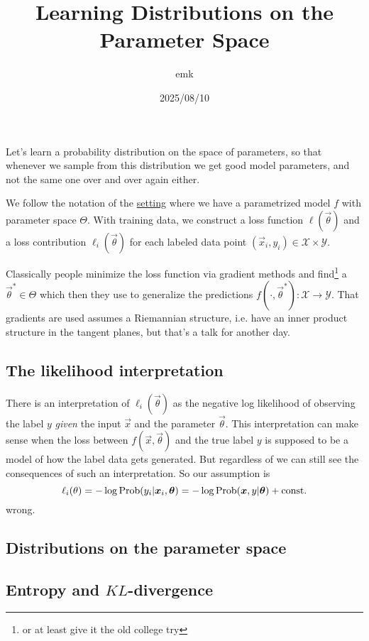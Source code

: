 \documentclass[12pt]{amsart}
\title{Learning Distributions on the Parameter Space}
\author{emk}
\date{2025/08/10}
\begin{document}
\maketitle

Let's learn a probability distribution on the space of parameters, so that whenever we sample from this distribution we get good model parameters, and not the same one over and over again either. 

We follow the notation of the \href{https://ekiral.github.io/blog/2025-06-05_notation.html}{setting} where we have a parametrized model $f$ with parameter space $\Theta$. With training data, we construct a loss function $\ell(\vec{\theta})$ and a loss contribution $\ell_i(\vec{\theta})$ for each labeled data point $(\vec{x}_i, y_i) \in \mathcal{X} \times \mathcal{Y}$. 

Classically people minimize the loss function via gradient methods and find\footnote{or at least give it the old college try} a $\vec{\theta}^* \in \Theta$ which then they use to generalize the predictions $f(\cdot, \vec{\theta}^*) : \mathcal{X} \to \mathcal{Y}$. That gradients are used assumes a Riemannian structure, i.e. have an inner product structure in the tangent planes, but that's a talk for another day.


\subsection*{The likelihood interpretation}

There is an interpretation of $\ell_i(\vec{\theta})$ as the negative log likelihood of observing  the label $y$ \emph{given} the input $\vec{x}$ and the parameter $\vec{\theta}$. This interpretation can make sense when the loss between $f(\vec{x}, \vec{\theta})$ and the true label $y$ is supposed to be a model of how the label data gets generated.  But regardless of  we can still see the consequences of such an interpretation. So our assumption is 
\[
	\ell_i(\theta) = -\log \operatorname{Prob}(y_i | \mathbf{\boldsymbol{x}}_i, \mathbf{\boldsymbol{\theta}}) = - \log \operatorname{Prob}(\mathbf{\boldsymbol{x}}, y | \mathbf{\boldsymbol{\theta}}) + \text{const.}
\] 
wrong.

\subsection*{Distributions on the parameter space} 
\subsection*{Entropy and $KL$-divergence} 
\end{document}
